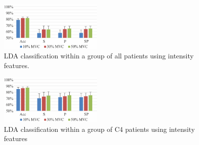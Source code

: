 
\begin{figure}[ht]
\centering
\includegraphics[width=0.45\textwidth]{Images/figure2_5.png}
\caption{LDA classification within a group of all patients using intensity features.}
\label{fig:2-5}
\end{figure}      

\begin{figure}[ht]
\centering
\includegraphics[width=0.45\textwidth]{Images/figure2_6.png}
\caption{LDA classification within a group of C4 patients using intensity features}
\label{fig:2-6}
\end{figure}      

